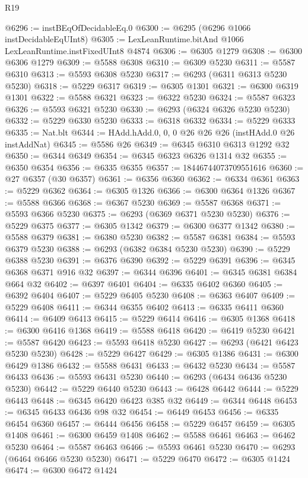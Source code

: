 \begin{lexlean}{R19}
\begin{coremodule}
@6296 := instBEqOfDecidableEq.{0}
@6300 := @6295 (@6296 @1066 instDecidableEqUInt8)
@6305 := LexLeanRuntime.bitAnd @1066 LexLeanRuntime.instFixedUInt8 @4874
@6306 := @6305 @1279
@6308 := @6300 @6306 @1279
@6309 := @5588 @6308
@6310 := @6309 @5230
@6311 := @5587 @6310
@6313 := @5593 @6308 @5230
@6317 := @6293 (@6311 @6313 @5230 @5230)
@6318 := @5229 @6317
@6319 := @6305 @1301
@6321 := @6300 @6319 @1301
@6322 := @5588 @6321
@6323 := @6322 @5230
@6324 := @5587 @6323
@6326 := @5593 @6321 @5230
@6330 := @6293 (@6324 @6326 @5230 @5230)
@6332 := @5229 @6330 @5230
@6333 := @6318 @6332
@6334 := @5229 @6333
@6335 := Nat.blt
@6344 := HAdd.hAdd.{0, 0, 0} @26 @26 @26 (instHAdd.{0} @26 instAddNat)
@6345 := @5586 @26
@6349 := @6345 @6310 @6313 @1292 @32
@6350 := @6344 @6349
@6354 := @6345 @6323 @6326 @1314 @32
@6355 := @6350 @6354
@6356 := @6335 @6355
@6357 := 18446744073709551616
@6360 := @27 @6357 (@30 @6357)
@6361 := @6356 @6360
@6362 := @6334 @6361
@6363 := @5229 @6362
@6364 := @6305 @1326
@6366 := @6300 @6364 @1326
@6367 := @5588 @6366
@6368 := @6367 @5230
@6369 := @5587 @6368
@6371 := @5593 @6366 @5230
@6375 := @6293 (@6369 @6371 @5230 @5230)
@6376 := @5229 @6375
@6377 := @6305 @1342
@6379 := @6300 @6377 @1342
@6380 := @5588 @6379
@6381 := @6380 @5230
@6382 := @5587 @6381
@6384 := @5593 @6379 @5230
@6388 := @6293 (@6382 @6384 @5230 @5230)
@6390 := @5229 @6388 @5230
@6391 := @6376 @6390
@6392 := @5229 @6391
@6396 := @6345 @6368 @6371 @916 @32
@6397 := @6344 @6396
@6401 := @6345 @6381 @6384 @664 @32
@6402 := @6397 @6401
@6404 := @6335 @6402 @6360
@6405 := @6392 @6404
@6407 := @5229 @6405 @5230
@6408 := @6363 @6407
@6409 := @5229 @6408
@6411 := @6344 @6355 @6402
@6413 := @6335 @6411 @6360
@6414 := @6409 @6413
@6415 := @5229 @6414
@6416 := @6305 @1368
@6418 := @6300 @6416 @1368
@6419 := @5588 @6418
@6420 := @6419 @5230
@6421 := @5587 @6420
@6423 := @5593 @6418 @5230
@6427 := @6293 (@6421 @6423 @5230 @5230)
@6428 := @5229 @6427
@6429 := @6305 @1386
@6431 := @6300 @6429 @1386
@6432 := @5588 @6431
@6433 := @6432 @5230
@6434 := @5587 @6433
@6436 := @5593 @6431 @5230
@6440 := @6293 (@6434 @6436 @5230 @5230)
@6442 := @5229 @6440 @5230
@6443 := @6428 @6442
@6444 := @5229 @6443
@6448 := @6345 @6420 @6423 @385 @32
@6449 := @6344 @6448
@6453 := @6345 @6433 @6436 @98 @32
@6454 := @6449 @6453
@6456 := @6335 @6454 @6360
@6457 := @6444 @6456
@6458 := @5229 @6457
@6459 := @6305 @1408
@6461 := @6300 @6459 @1408
@6462 := @5588 @6461
@6463 := @6462 @5230
@6464 := @5587 @6463
@6466 := @5593 @6461 @5230
@6470 := @6293 (@6464 @6466 @5230 @5230)
@6471 := @5229 @6470
@6472 := @6305 @1424
@6474 := @6300 @6472 @1424

\end{coremodule}
\end{lexlean}
